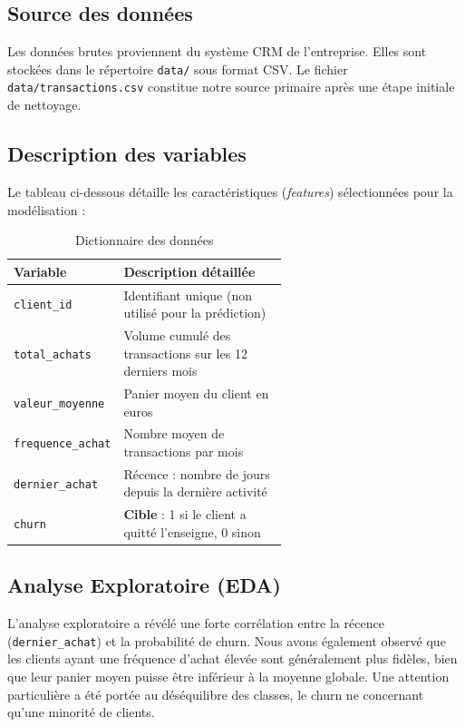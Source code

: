 \documentclass[12pt,a4paper]{article}
\begin{document}
\subsection{Source des données}
Les données brutes proviennent du système CRM de l'entreprise. Elles sont stockées dans le répertoire \texttt{data/} sous format CSV. Le fichier \texttt{data/transactions.csv} constitue notre source primaire après une étape initiale de nettoyage.

\subsection{Description des variables}
Le tableau ci-dessous détaille les caractéristiques (\textit{features}) sélectionnées pour la modélisation :

\begin{table}[H]
\centering
\begin{tabular}{lp{0.6\linewidth}}
\toprule
Variable & Description détaillée \\
\midrule
\texttt{client\_id} & Identifiant unique (non utilisé pour la prédiction) \\
\texttt{total\_achats} & Volume cumulé des transactions sur les 12 derniers mois \\
\texttt{valeur\_moyenne} & Panier moyen du client en euros \\
\texttt{frequence\_achat} & Nombre moyen de transactions par mois \\
\texttt{dernier\_achat} & Récence : nombre de jours depuis la dernière activité \\
\texttt{churn} & \textbf{Cible} : 1 si le client a quitté l'enseigne, 0 sinon \\
\bottomrule
\end{tabular}
\caption{Dictionnaire des données}
\end{table}

\subsection{Analyse Exploratoire (EDA)}
L'analyse exploratoire a révélé une forte corrélation entre la récence (\texttt{dernier\_achat}) et la probabilité de churn. Nous avons également observé que les clients ayant une fréquence d'achat élevée sont généralement plus fidèles, bien que leur panier moyen puisse être inférieur à la moyenne globale. Une attention particulière a été portée au déséquilibre des classes, le churn ne concernant qu'une minorité de clients.
\end{document}
